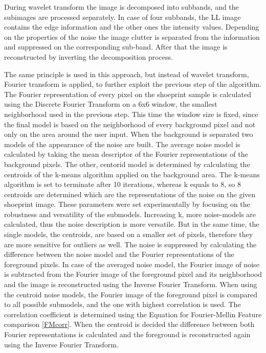 \documentclass[draft,final]{vutinfth} %
\begin{document}
During wavelet transform the image is decomposed into subbands, and the subimages are processed separately.
In case of four subbands, the LL image contains the edge information and the other ones the intensity values.
Depending on the properties of the noise the image clutter is separated from the information and suppressed on the corresponding sub-band.
After that the image is reconstructed by inverting the decomposition process.
\par
The same principle is used in this approach, but instead of wavelet transform, Fourier transform is applied, to further exploit the previous step of the algorithm.
The Fourier representation of every pixel on the shoeprint sample is calculated using the Discrete Fourier Transform on a 6x6 window, the smallest neighborhood used in the previous step.
This time the window size is fixed, since the final model is based on the neighborhood of every background pixel and not only on the area around the user input.
When the background is separated two models of the appearance of the noise are built.
The average noise model is calculated by taking the mean descriptor of the Fourier representations of the background pixels. 
The other, centorid model is determined by calculating the centroids of the k-means algorithm applied on the background area.
The k-means algorithm is set to terminate after 10 iterations, whereas k equals to 8, so 8 centroids are determined which are the representations of the noise on the given shoeprint image.
These parameters were set experimentally by focusing on the robustness and versatility of the submodels.
Increasing k, more noise-models are calculated, thus the noise description is more versatile.
But in the same time, the single models, the centroids, are based on a smaller set of pixels, therefore they are more sensitive for outliers as well. 
The noise is suppressed by calculating the difference between the noise model and the Fourier representations of the foreground pixels.
In case of the averaged noise model, the Fourier image of noise is subtracted from the Fourier image of the foreground pixel and its neighborhood and the image is reconstructed using the Inverse Fourier Transform.
When using the centroid noise models, the Fourier image of the foreground pixel is compared to all possible submodels, and the one with highest correlation is used.
The correlation coefficient is determined using the Equation for Fourier-Mellin Feature comparison \ref{FMcorr}.
When the centroid is decided the difference between both Fourier representations is calculated and the foreground is reconstructed again using the Inverse Fourier Transform.
\end{document}
